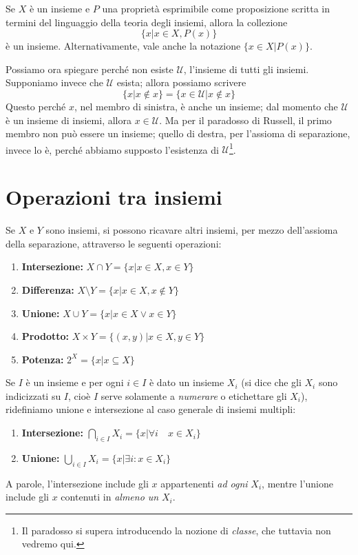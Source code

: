 \documentclass[oneside]{book}
\theoremstyle{remark}
\begin{document}
\begin{tcolorbox}[colback=yellow!30, colframe=yellow!30!black, title={Assioma della separazione}]
Se $X$ è un insieme e $P$ una proprietà esprimibile come proposizione
scritta in termini del linguaggio della teoria degli insiemi, allora
la collezione
\[ \{x|x\in X, P(x)\} \]
è un insieme. Alternativamente, vale anche la notazione $\{x\in X|P(x)\}$.
\end{tcolorbox}

Possiamo ora spiegare perché non esiste $\mathcal{U}$, l'insieme di tutti
gli insiemi. Supponiamo invece che $\mathcal{U}$ esista; allora possiamo
scrivere
\[ \{x|x\not\in x\} = \{x\in\mathcal{U}|x\not\in x\} \]
Questo perché $x$, nel membro di sinistra, è anche un insieme; dal momento
che $\mathcal{U}$ è un insieme di insiemi, allora $x\in\mathcal{U}$.
Ma per il paradosso di Russell, il primo membro non può essere un insieme;
quello di destra, per l'assioma di separazione, invece lo è, perché abbiamo
supposto l'esistenza di $\mathcal{U}$\footnote{Il paradosso si supera
introducendo la nozione di \textit{classe}, che tuttavia non vedremo qui.}.

\section{Operazioni tra insiemi}
Se $X$ e $Y$ sono insiemi, si possono ricavare altri insiemi, per mezzo
dell'assioma della separazione, attraverso le seguenti operazioni:
\begin{enumerate}
\item \textbf{Intersezione:} $X\cap Y=\{x|x\in X, x\in Y\}$
\item \textbf{Differenza:} $X\setminus Y=\{x|x\in X,x\not\in Y\}$
\item \textbf{Unione:} $X\cup Y=\{x|x\in X \vee x\in Y\}$
\item \textbf{Prodotto:} $X\times Y=\{(x,y)|x\in X, y\in Y\}$
\item \textbf{Potenza:} $2^X=\{x|x\subseteq X\}$
\end{enumerate}
Se $I$ è un insieme e per ogni $i\in I$ è dato un insieme $X_i$
(si dice che gli $X_i$ sono indicizzati su $I$, cioè $I$ serve
solamente a \emph{numerare} o etichettare gli $X_i$), ridefiniamo
unione e intersezione al caso generale di insiemi multipli:
\begin{enumerate}
\item \textbf{Intersezione:} $\bigcap_{i\in I}X_i=\{x|\forall i \quad x\in X_i\}$
\item \textbf{Unione:} $\bigcup_{i\in I}X_i=\{x|\exists i:x\in X_i\}$
\end{enumerate}
A parole, l'intersezione include gli $x$ appartenenti \textit{ad ogni}
$X_i$, mentre l'unione include gli $x$ contenuti in \textit{almeno un}
$X_i$.
\end{document}
